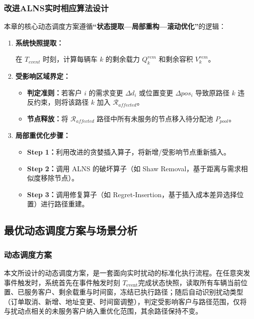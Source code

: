 \documentclass[12pt,a4paper]{article}
\begin{document}
\subsubsection{改进ALNS实时相应算法设计}
本章的核心动态调度方案遵循\textbf{“状态提取—局部重构—滚动优化”}的逻辑：
\begin{enumerate}
    \item \textbf{系统快照提取：}
    
    在 $T_{event}$ 时刻，计算每辆车 $k$ 的剩余载力 $Q_k^{rem}$ 和剩余容积 $V_k^{rem}$。
    \item \textbf{受影响区域界定：}
        \begin{itemize}
            \item \textbf{判定准则：}若客户 $i$ 的需求变更 $\Delta d_i$ 或位置变更 $\Delta pos_i$ 导致原路径 $k$ 违反约束，则将该路径 $k$ 加入 $\mathcal{R}_{affected}$。
            \item \textbf{节点释放：}将 $\mathcal{R}_{affected}$ 路径中所有未服务的节点移入待分配池 $P_{pool}$。
        \end{itemize}
    \item \textbf{局部重优化步骤：}
        \begin{itemize}
            \item \textbf{Step 1：}利用改进的贪婪插入算子，将新增/受影响节点重新插入。
            \item \textbf{Step 2：}调用 ALNS 的破坏算子（如 Shaw Removal，基于距离与需求相似度移除节点）。
            \item \textbf{Step 3：}调用修复算子（如 Regret-Insertion，基于插入成本差异选择位置）进行路径重建。
        \end{itemize}
\end{enumerate}


\subsection{最优动态调度方案与场景分析}

\subsubsection{动态调度方案}
本文所设计的动态调度方案，是一套面向实时扰动的标准化执行流程。在任意突发事件触发时，系统首先在事件触发时刻  \(T_{\text{event}}\)完成状态快照，读取所有车辆当前位置、已服务客户、剩余载重与时间窗，冻结已执行路径；随后自动识别扰动类型（订单取消、新增、地址变更、时间窗调整），判定受影响客户与路径范围，仅将与扰动点相关的未服务客户纳入重优化范围，其余路径保持不变。
\end{document}

